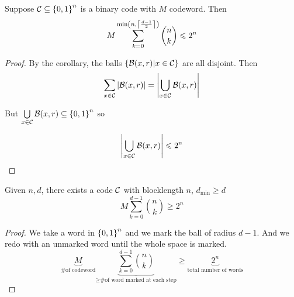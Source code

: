 \begin{theorem}
    Suppose $\mathcal{C} \subseteq \left\{ 0,1 \right\}^n$ is a binary code with $M$ codeword. Then
    \[
        M \sum\limits_{k=0}^{\min\left(n,\left\lceil \frac{d-1}{2} \right\rceil\right)}\binom{n}{k} \leqslant 2^n
    \]
\end{theorem}
\begin{proof}
    By the corollary, the balls $\left\{ \mathcal{B}(x,r)\vert x \in \mathcal{C} \right\}$ are all disjoint. Then
    \[
        \sum\limits_{x\in \mathcal{C}}\left\lvert\mathcal{B}(x,r)\right\rvert = \left\lvert\bigcup\limits_{x \in \mathcal{C}} \mathcal{B}(x,r)\right\rvert
    \]

    But $\bigcup\limits_{x \in \mathcal{C}} \mathcal{B}(x,r) \subseteq \left\{ 0,1 \right\}^n$ so
    
    \[
        \left\lvert\bigcup\limits_{x \in \mathcal{C}} \mathcal{B}(x,r)\right\rvert \leqslant 2^n
    \]
\end{proof}


\begin{theorem}
    Given $n, d$, there exists a code $\mathcal{C}$ with blocklength $n$, $d_{\min} \geqslant d$
    \[
        M \sum\limits_{k=0}^{d-1} \binom{n}{k} \geqslant 2^n
    \]
\end{theorem}
\begin{proof}
    We take a word in $\left\{ 0,1 \right\}^n$ and we mark the ball of radius $d-1$. And we redo with an unmarked word until the whole space is marked.
    \[
        \underbrace{M}_{\text{\# of codeword}} \underbrace{\sum\limits_{k=0}^{d-1} \binom{n}{k}}_{\geqslant \text{\# of word marked at each step}} \geqslant \underbrace{2^n}_{\text{total number of words}}
    \]
\end{proof}













